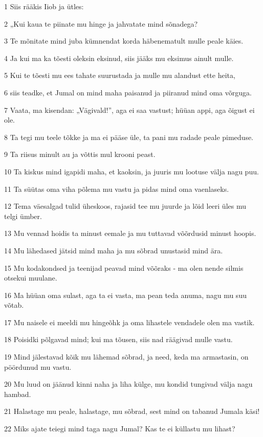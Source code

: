 \par 1 Siis rääkis Iiob ja ütles:
\par 2 „Kui kaua te piinate mu hinge ja jahvatate mind sõnadega?
\par 3 Te mõnitate mind juba kümnendat korda häbenematult mulle peale käies.
\par 4 Ja kui ma ka tõesti oleksin eksinud, siis jääks mu eksimus ainult mulle.
\par 5 Kui te tõesti mu ees tahate suurustada ja mulle mu alandust ette heita,
\par 6 siis teadke, et Jumal on mind maha paisanud ja piiranud mind oma võrguga.
\par 7 Vaata, ma kisendan: „Vägivald!”, aga ei saa vastust; hüüan appi, aga õigust ei ole.
\par 8 Ta tegi mu teele tõkke ja ma ei pääse üle, ta pani mu radade peale pimeduse.
\par 9 Ta riisus minult au ja võttis mul krooni peast.
\par 10 Ta kiskus mind igapidi maha, et kaoksin, ja juuris mu lootuse välja nagu puu.
\par 11 Ta süütas oma viha põlema mu vastu ja pidas mind oma vaenlaseks.
\par 12 Tema väesalgad tulid üheskoos, rajasid tee mu juurde ja lõid leeri üles mu telgi ümber.
\par 13 Mu vennad hoidis ta minust eemale ja mu tuttavad võõrdusid minust hoopis.
\par 14 Mu lähedased jätsid mind maha ja mu sõbrad unustasid mind ära.
\par 15 Mu kodakondsed ja teenijad peavad mind võõraks - ma olen nende silmis otsekui muulane.
\par 16 Ma hüüan oma sulast, aga ta ei vasta, ma pean teda anuma, nagu mu suu võtab.
\par 17 Mu naisele ei meeldi mu hingeõhk ja oma lihastele vendadele olen ma vastik.
\par 18 Poisidki põlgavad mind; kui ma tõusen, siis nad räägivad mulle vastu.
\par 19 Mind jälestavad kõik mu lähemad sõbrad, ja need, keda ma armastasin, on pöördunud mu vastu.
\par 20 Mu luud on jäänud kinni naha ja liha külge, mu kondid tungivad välja nagu hambad.
\par 21 Halastage mu peale, halastage, mu sõbrad, sest mind on tabanud Jumala käsi!
\par 22 Miks ajate teiegi mind taga nagu Jumal? Kas te ei küllastu mu lihast?
